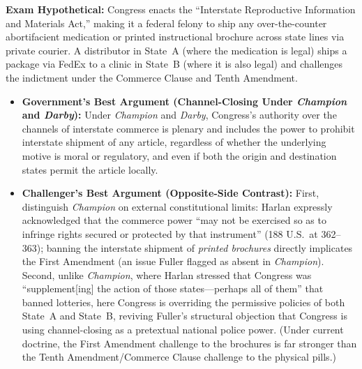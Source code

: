 \documentclass[12pt]{article}
\begin{document}
\textbf{Exam Hypothetical:} Congress enacts the ``Interstate Reproductive Information and Materials Act,'' making it a federal felony to ship any over-the-counter abortifacient medication or printed instructional brochure across state lines via private courier. A distributor in State~A (where the medication is legal) ships a package via FedEx to a clinic in State~B (where it is also legal) and challenges the indictment under the Commerce Clause and Tenth Amendment.
\begin{itemize}
  \item \textbf{Government's Best Argument (Channel-Closing Under \textit{Champion} and \textit{Darby}):} Under \textit{Champion} and \textit{Darby}, Congress's authority over the channels of interstate commerce is plenary and includes the power to prohibit interstate shipment of any article, regardless of whether the underlying motive is moral or regulatory, and even if both the origin and destination states permit the article locally.
  \item \textbf{Challenger's Best Argument (Opposite-Side Contrast):} First, distinguish \textit{Champion} on external constitutional limits: Harlan expressly acknowledged that the commerce power ``may not be exercised so as to infringe rights secured or protected by that instrument'' (188 U.S.\ at 362--363); banning the interstate shipment of \textit{printed brochures} directly implicates the First Amendment (an issue Fuller flagged as absent in \textit{Champion}). Second, unlike \textit{Champion}, where Harlan stressed that Congress was ``supplement[ing] the action of those states---perhaps all of them'' that banned lotteries, here Congress is overriding the permissive policies of both State~A and State~B, reviving Fuller's structural objection that Congress is using channel-closing as a pretextual national police power. (Under current doctrine, the First Amendment challenge to the brochures is far stronger than the Tenth Amendment/Commerce Clause challenge to the physical pills.)
\end{itemize}
\end{document}
